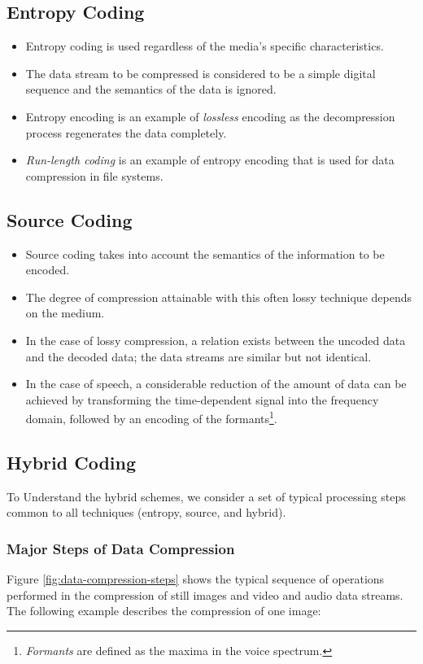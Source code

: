 \subsection{Entropy Coding}
\begin{itemize}
	\item Entropy coding is used regardless of the media's specific characteristics. 
	\item The data stream to be compressed is considered to be a simple digital sequence and the semantics of the data is ignored. 
	\item Entropy encoding is an example of \textit{lossless} encoding as the decompression process regenerates the data completely. 
	\item \textit{Run-length coding} is an example of entropy encoding that is used for data compression in file systems.
\end{itemize}


\subsection{Source Coding}

\begin{itemize}
	\item Source coding takes into account the semantics of the information to be encoded. 
	\item The degree of compression attainable with this often lossy technique depends on the medium. 
	\item In the case of lossy compression, a relation exists between the uncoded data and the decoded data; the data streams are similar but not identical. 
	\item In the case of speech, a considerable reduction of the amount of data can be achieved by transforming the time-dependent signal into the frequency domain, followed by an encoding of the formants\footnote{\textit{Formants} are defined as the maxima in the voice spectrum.}.
\end{itemize}





\subsection{Hybrid Coding}
To Understand the hybrid schemes, we consider a set of typical processing steps common to all techniques (entropy, source, and hybrid).

\subsubsection*{Major Steps of Data Compression}
Figure {\ref{fig:data-compression-steps}} shows the typical sequence of operations performed in the compression of still images and video and audio data streams. The following example describes the compression of one image:



